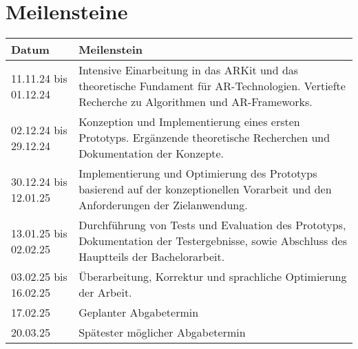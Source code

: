 \section{Meilensteine}
\label{sec:milestones}

\begin{tabular}[b]{|p{}|p{}|}

\hline
\textbf{Datum} & \textbf{Meilenstein} \\

\hline
11.11.24 bis 01.12.24 & Intensive Einarbeitung in das ARKit und das theoretische Fundament f\"ur AR-Technologien. Vertiefte Recherche zu Algorithmen und AR-Frameworks.\\

\hline
02.12.24 bis 29.12.24 & Konzeption und Implementierung eines ersten Prototyps. Erg\"anzende theoretische Recherchen und Dokumentation der Konzepte.\\

\hline
30.12.24 bis 12.01.25 & Implementierung und Optimierung des Prototyps basierend auf der konzeptionellen Vorarbeit und den Anforderungen der Zielanwendung.\\

\hline
13.01.25 bis 02.02.25 & Durchf\"uhrung von Tests und Evaluation des Prototyps, Dokumentation der Testergebnisse, sowie Abschluss des Hauptteils der Bachelorarbeit.\\

\hline
03.02.25 bis 16.02.25 & \"Uberarbeitung, Korrektur und sprachliche Optimierung der Arbeit.\\

\hline
17.02.25 & Geplanter Abgabetermin \\

\hline
20.03.25 & Sp\"atester m\"oglicher Abgabetermin \\

\hline

\end{tabular}

